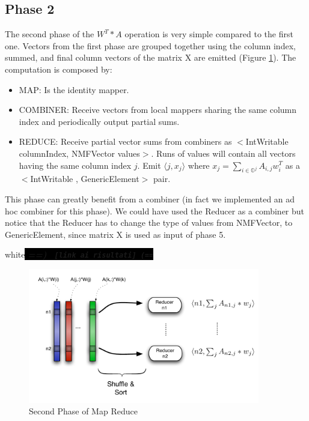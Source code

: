 \documentclass[a4paper,12pt]{article}
\newcommand{\javalisting}[2]{
	
}
\newcommand{\commento}[1]{\begin{color}{white}\colorbox{black}{
	\textit{\textbf{==) \texttt{ [#1] (==}}}}\end{color}
}
\begin{document}

\subsection{Phase 2}
\label{sec:phase2}

The second phase of the $W^T*A$ operation is very simple compared to the first one.
Vectors from the first phase are grouped together using the column index, summed, and final column vectors of the matrix X are emitted (Figure \ref{fig:Map2}).
The computation is composed by:
\begin{itemize}
          \item MAP: Is the identity mapper.
			\item COMBINER: Receive vectors from local mappers sharing the same column index and periodically output partial sums.
          \item REDUCE: Receive partial vector sums from combiners as $<$IntWritable columnIndex, NMFVector values$>$. 
          Runs of values will contain all vectors having the same column index $j$. 
          Emit $\langle j, x_j \rangle$ where $ x_j = \sum_{i \in \mathbb{O}^j} A_{i,j}  w_{i}^{T} $ as a $<$IntWritable , GenericElement$>$ pair.
\end{itemize}
This phase can greatly benefit from a combiner (in fact we implemented an ad hoc combiner for this phase).
We could have used the Reducer as a combiner but notice that the Reducer has to change the type of values from NMFVector, to GenericElement, since matrix X is used as input of phase 5.
\commento{link ai risultati}

\begin{center}
	\begin{figure}[h]
	\centering
	\includegraphics[width=0.9\textwidth]{./figures/Map2}
	\caption{Second Phase of Map Reduce}
	\label{fig:Map2}
	\end{figure}
\end{center}
\end{document}
